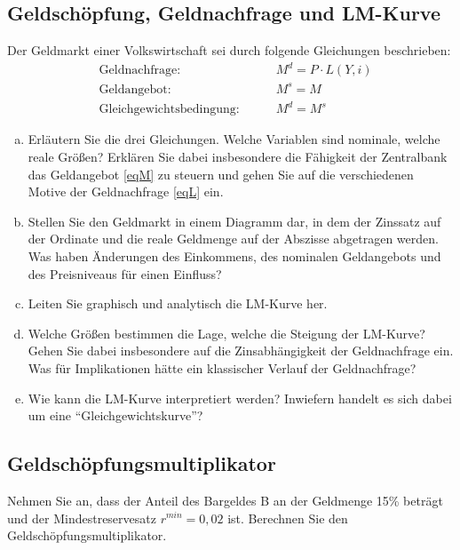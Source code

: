 \documentclass{scrartcl}
\begin{document}
\subsection{Geldsch\"{o}pfung, Geldnachfrage und LM-Kurve}
Der Geldmarkt einer Volkswirtschaft sei durch folgende
Gleichungen beschrieben:
\begin{align}
  &\text{Geldnachfrage: } &\quad& M^d = P \cdot L(Y,i) \label{eqL}\\
    &\text{Geldangebot: } &\quad& M^s=M\label{eqM}\\
  &\text{Gleichgewichtsbedingung: } &\quad& M^d=M^s
\end{align}
\begin{enumerate}[(a)]
  \item Erl\"{a}utern Sie die drei Gleichungen. Welche Variablen sind
      nominale, welche reale Gr\"{o}{\ss}en? Erkl\"{a}ren Sie dabei insbesondere die F\"{a}higkeit der Zentralbank das Geldangebot \eqref{eqM} zu steuern und gehen Sie auf die
      verschiedenen Motive der Geldnachfrage \eqref{eqL} ein.
  \item Stellen Sie den Geldmarkt in einem Diagramm dar, in dem der
      Zinssatz auf der Ordinate und die reale Geldmenge auf der Abszisse
      abgetragen werden. Was haben \"{A}nderungen des Einkommens, des
      nominalen Geldangebots und des Preisniveaus f\"{u}r einen Einfluss?
  \item Leiten Sie graphisch und analytisch die LM-Kurve her.
  \item Welche Gr\"{o}{\ss}en bestimmen die Lage, welche die Steigung der
      LM-Kurve? Gehen Sie dabei insbesondere auf die Zinsabh\"{a}ngigkeit der
      Geldnachfrage ein. Was für Implikationen hätte ein klassischer Verlauf der Geldnachfrage?
  \item Wie kann die LM-Kurve interpretiert werden? Inwiefern handelt es
      sich dabei um eine \enquote{Gleichgewichtskurve}?
\end{enumerate}
\subsection{Geldsch\"{o}pfungsmultiplikator}
Nehmen Sie an, dass der Anteil des Bargeldes B an der Geldmenge 15\% betr\"{a}gt und der
Mindestreservesatz $r^{min} = 0,02$ ist. Berechnen Sie den Geldsch\"{o}pfungsmultiplikator.
\end{document}
